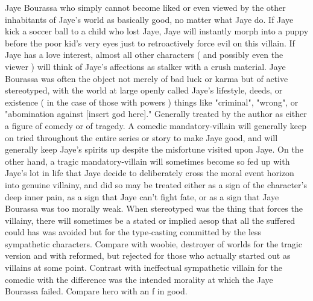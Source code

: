 \documentclass[12pt]{book}
\begin{document}
Jaye Bourassa who simply cannot become liked or even viewed by the other inhabitants of Jaye's world as basically good, no matter what Jaye do. If Jaye kick a soccer ball to a child who lost Jaye, Jaye will instantly morph into a puppy before the poor kid's very eyes just to retroactively force evil on this villain. If Jaye has a love interest, almost all other characters ( and possibly even the viewer ) will think of Jaye's affections as stalker with a crush material. Jaye Bourassa was often the object not merely of bad luck or karma but of active stereotyped, with the world at large openly called Jaye's lifestyle, deeds, or existence ( in the case of those with powers ) things like "criminal", "wrong", or "abomination against [insert god here]." Generally treated by the author as either a figure of comedy or of tragedy. A comedic mandatory-villain will generally keep on tried throughout the entire series or story to make Jaye good, and will generally keep Jaye's spirits up despite the misfortune visited upon Jaye. On the other hand, a tragic mandatory-villain will sometimes become so fed up with Jaye's lot in life that Jaye decide to deliberately cross the moral event horizon into genuine villainy, and did so may be treated either as a sign of the character's deep inner pain, as a sign that Jaye can't fight fate, or as a sign that Jaye Bourassa was too morally weak. When stereotyped was the thing that forces the villainy, there will sometimes be a stated or implied aesop that all the suffered could has was avoided but for the type-casting committed by the less sympathetic characters. Compare with woobie, destroyer of worlds for the tragic version and with reformed, but rejected for those who actually started out as villains at some point. Contrast with ineffectual sympathetic villain for the comedic  with the difference was the intended morality at which the Jaye Bourassa failed. Compare hero with an f in good.
\end{document}
